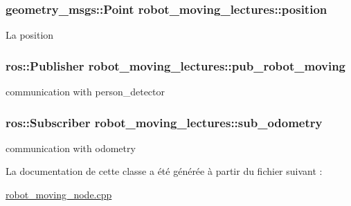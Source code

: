 \subsubsection[{\texorpdfstring{position}{position}}]{\setlength{\rightskip}{0pt plus 5cm}geometry\+\_\+msgs\+::\+Point robot\+\_\+moving\+\_\+lectures\+::position\hspace{0.3cm}{\ttfamily [private]}}\hypertarget{classrobot__moving__lectures_ae6187e99da86dd6b41c5052278a84d93}{}\label{classrobot__moving__lectures_ae6187e99da86dd6b41c5052278a84d93}
La position 
\subsubsection[{\texorpdfstring{pub\+\_\+robot\+\_\+moving}{pub_robot_moving}}]{\setlength{\rightskip}{0pt plus 5cm}ros\+::\+Publisher robot\+\_\+moving\+\_\+lectures\+::pub\+\_\+robot\+\_\+moving\hspace{0.3cm}{\ttfamily [private]}}\hypertarget{classrobot__moving__lectures_aac8988bf2f9e44849d2ca98bbbdda9ab}{}\label{classrobot__moving__lectures_aac8988bf2f9e44849d2ca98bbbdda9ab}
communication with person\+\_\+detector 
\subsubsection[{\texorpdfstring{sub\+\_\+odometry}{sub_odometry}}]{\setlength{\rightskip}{0pt plus 5cm}ros\+::\+Subscriber robot\+\_\+moving\+\_\+lectures\+::sub\+\_\+odometry\hspace{0.3cm}{\ttfamily [private]}}\hypertarget{classrobot__moving__lectures_aaadaf3fdebc47dffb5c8b90faf019b09}{}\label{classrobot__moving__lectures_aaadaf3fdebc47dffb5c8b90faf019b09}
communication with odometry 

La documentation de cette classe a été générée à partir du fichier suivant \+:\begin{DoxyCompactItemize}
\item 
\hyperlink{robot__moving__node_8cpp}{robot\+\_\+moving\+\_\+node.\+cpp}\end{DoxyCompactItemize}
